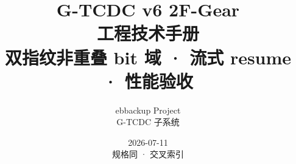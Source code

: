\documentclass[12pt,a4paper,openany]{ctexbook}
\title{G-TCDC v6 2F-Gear\\[0.35em]\large 工程技术手册\\[0.2em]\normalsize 双指纹非重叠 bit 域 · 流式 resume · 性能验收}
\author{ebbackup Project\\\filepath{engine\_cpp/} G-TCDC 子系统}
\date{2026-07-11\\{\small 规格同 \filepath{kernel-manual/} · 交叉索引 \filepath{GT\_CDC\_SPEC.md}}}
\begin{document}
\frontmatter
\maketitle

\tableofcontents
\listoffigures
\listoftables
\lstlistoflistings

\mainmatter









\appendix


\backmatter
\end{document}
